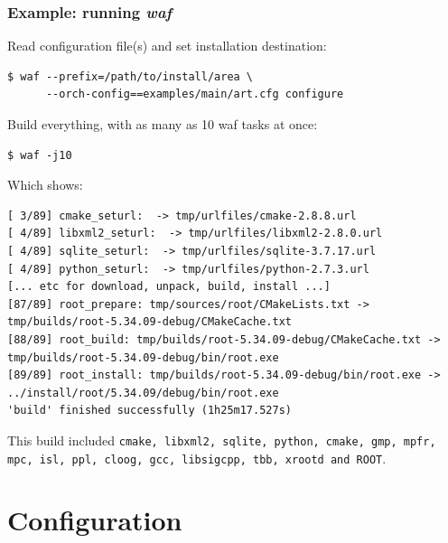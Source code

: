 \documentclass[xcolor=dvipsnames]{beamer}
\newcommand{\app}[1]{\textbf{\textit{#1}}\xspace}
\def\waf{\app{waf}}
\begin{document}
\begin{frame}[fragile]
  \frametitle{Example: running \waf}

  \footnotesize

  Read configuration file(s) and set installation destination:

\begin{verbatim}
$ waf --prefix=/path/to/install/area \
      --orch-config==examples/main/art.cfg configure
\end{verbatim}
  
  Build everything, with as many as 10 waf tasks at once:

\begin{verbatim}
$ waf -j10
\end{verbatim}

  Which shows:

\begin{verbatim}
[ 3/89] cmake_seturl:  -> tmp/urlfiles/cmake-2.8.8.url
[ 4/89] libxml2_seturl:  -> tmp/urlfiles/libxml2-2.8.0.url
[ 4/89] sqlite_seturl:  -> tmp/urlfiles/sqlite-3.7.17.url
[ 4/89] python_seturl:  -> tmp/urlfiles/python-2.7.3.url
[... etc for download, unpack, build, install ...]
[87/89] root_prepare: tmp/sources/root/CMakeLists.txt -> tmp/builds/root-5.34.09-debug/CMakeCache.txt
[88/89] root_build: tmp/builds/root-5.34.09-debug/CMakeCache.txt -> tmp/builds/root-5.34.09-debug/bin/root.exe
[89/89] root_install: tmp/builds/root-5.34.09-debug/bin/root.exe -> ../install/root/5.34.09/debug/bin/root.exe
'build' finished successfully (1h25m17.527s)
\end{verbatim}

This build included \texttt{cmake, libxml2, sqlite, python, cmake, gmp, mpfr, mpc, isl, ppl, cloog, gcc, libsigcpp, tbb, xrootd and ROOT}.

\end{frame}

\section{Configuration}
\end{document}
